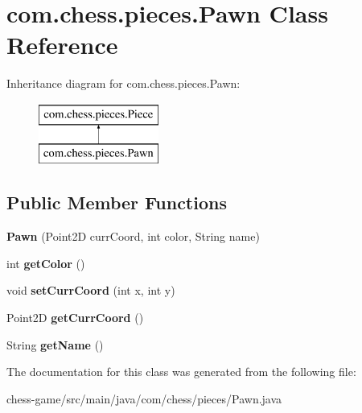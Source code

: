 \hypertarget{classcom_1_1chess_1_1pieces_1_1_pawn}{}\section{com.\+chess.\+pieces.\+Pawn Class Reference}
\label{classcom_1_1chess_1_1pieces_1_1_pawn}
Inheritance diagram for com.\+chess.\+pieces.\+Pawn\+:\begin{figure}[H]
\begin{center}
\leavevmode
\includegraphics[height=2.000000cm]{classcom_1_1chess_1_1pieces_1_1_pawn}
\end{center}
\end{figure}
\subsection*{Public Member Functions}
\begin{DoxyCompactItemize}
\item 
\mbox{\label{classcom_1_1chess_1_1pieces_1_1_pawn_a871085a32b2e14a8477425d121b35d4a}} 
{\bfseries Pawn} (Point2D curr\+Coord, int color, String name)
\item 
\mbox{\label{classcom_1_1chess_1_1pieces_1_1_pawn_a45a26dac7f95b47dc783b277f4c9b441}} 
int {\bfseries get\+Color} ()
\item 
\mbox{\label{classcom_1_1chess_1_1pieces_1_1_pawn_a5e7dd29728be5a939f255c60b9d2d933}} 
void {\bfseries set\+Curr\+Coord} (int x, int y)
\item 
\mbox{\label{classcom_1_1chess_1_1pieces_1_1_pawn_aa1717847c0180e3f22850b4b6270d02d}} 
Point2D {\bfseries get\+Curr\+Coord} ()
\item 
\mbox{\label{classcom_1_1chess_1_1pieces_1_1_pawn_a1a5e09c7d438cadd2321e5a06a88181b}} 
String {\bfseries get\+Name} ()
\end{DoxyCompactItemize}


The documentation for this class was generated from the following file\+:\begin{DoxyCompactItemize}
\item 
chess-\/game/src/main/java/com/chess/pieces/Pawn.\+java\end{DoxyCompactItemize}

